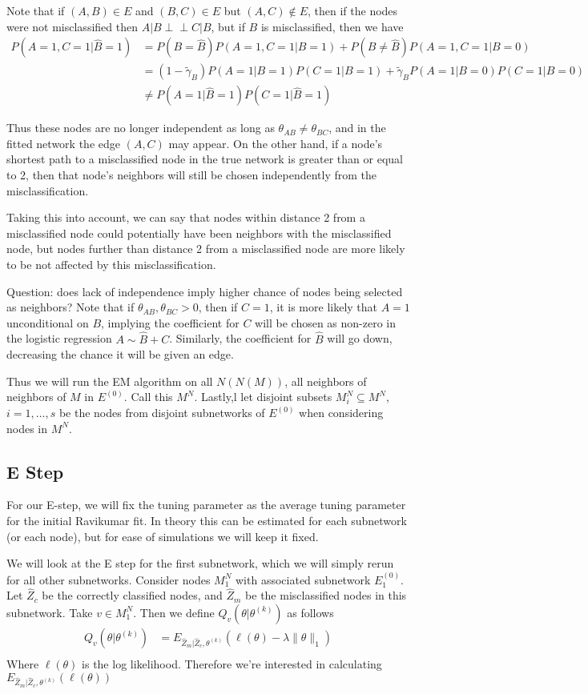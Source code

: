 \documentclass[12pt]{article}
\begin{document}
Note that if $(A, B) \in E$ and $(B, C) \in E$ but $(A, C) \not\in E$, then if the nodes were not misclassified then $A|B \perp\!\!\!\!\perp C|B$, but if $B$ is misclassified, then we have
\begin{align*}
P(A=1, C=1|\hat{B}=1) &= P(B = \hat{B})P(A=1, C=1|B=1) + P(B\neq \hat{B})P(A=1, C=1|B = 0) \\
&= (1-\tilde\gamma_B)P(A=1|B=1)P(C=1|B=1) + \tilde\gamma_BP(A =1|B=0)P(C=1|B=0) \\
&\neq P(A=1|\hat{B}=1)P(C=1|\hat{B}=1)
\end{align*}

Thus these nodes are no longer independent as long as $\theta_{AB} \neq \theta_{BC}$, and in the fitted network the edge $(A, C)$ may appear.  On the other hand, if a node's shortest path to a misclassified node in the true network is greater than or equal to 2, then that node's neighbors will still be chosen independently from the misclassification.  

Taking this into account, we can say that nodes within distance 2 from a misclassified node could potentially have been neighbors with the misclassified node, but nodes further than distance 2 from a misclassified node are more likely to be not affected by this misclassification.

Question: does lack of independence imply higher chance of nodes being selected as neighbors?  Note that if $\theta_{AB}, \theta_{BC} > 0$, then if $C = 1$, it is more likely that $A = 1$ unconditional on $B$, implying the coefficient for $C$ will be chosen as non-zero in the logistic regression $A\sim\hat{B}+C$.  Similarly, the coefficient for $\hat{B}$ will go down, decreasing the chance it will be given an edge. 

Thus we will run the EM algorithm on all $N(N(M))$, all neighbors of neighbors of $M$ in $E^{(0)}$.  Call this $M^N$.  Lastly,l let disjoint subsets $M_i^N \subseteq M^N$, $i = 1, \dots, s$ be the nodes from disjoint subnetworks of $E^{(0)}$ when considering nodes in $M^N$.

\subsection{E Step}
For our E-step, we will fix the tuning parameter as the average tuning parameter for the initial Ravikumar fit.  In theory this can be estimated for each subnetwork (or each node), but for ease of simulations we will keep it fixed.

We will look at the E step for the first subnetwork, which we will simply rerun for all other subnetworks.  Consider nodes $M_1^N$ with associated subnetwork $E^{(0)}_1$.  Let $\hat{Z}_c$ be the correctly classified nodes, and $\hat{Z}_m$ be the misclassified nodes in this subnetwork.  Take $v \in M_1^N$. Then we define $Q_v(\theta | \theta^{(k)})$ as follows
\begin{align*}
Q_v(\theta | \theta^{(k)}) &= E_{\hat{Z}_m|\hat{Z}_c, \theta^{(k)}} \left(\ell(\theta)-\lambda \|\theta\|_1\right) \\
\end{align*}
Where $\ell(\theta)$ is the log likelihood.  Therefore we're interested in calculating $E_{\hat{Z}_m|\hat{Z}_c, \theta^{(k)}}(\ell(\theta))$
\end{document}
